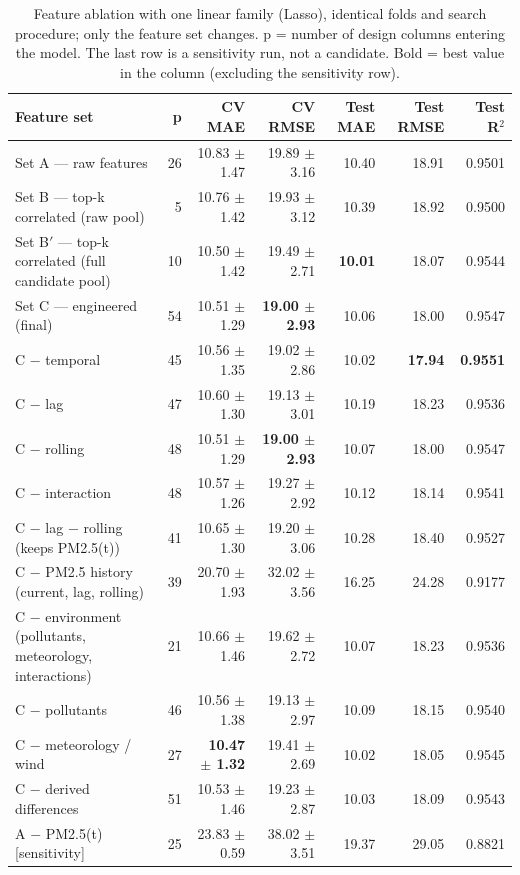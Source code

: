 \begin{table}[t]
\centering
\small
\caption{Feature ablation with one linear family (Lasso), identical folds and search procedure; only the feature set changes. p = number of design columns entering the model. The last row is a sensitivity run, not a candidate. Bold = best value in the column (excluding the sensitivity row).}
\label{tab:table_4_feature_ablation}
\begin{tabular}{p{6.2cm}rrrrrr}
\toprule
Feature set & p & CV MAE & CV RMSE & Test MAE & Test RMSE & Test R$^2$ \\
\midrule
Set A --- raw features & 26 & 10.83 $\pm$ 1.47 & 19.89 $\pm$ 3.16 & 10.40 & 18.91 & 0.9501 \\
Set B --- top-k correlated (raw pool) & 5 & 10.76 $\pm$ 1.42 & 19.93 $\pm$ 3.12 & 10.39 & 18.92 & 0.9500 \\
Set B$'$ --- top-k correlated (full candidate pool) & 10 & 10.50 $\pm$ 1.42 & 19.49 $\pm$ 2.71 & \textbf{10.01} & 18.07 & 0.9544 \\
Set C --- engineered (final) & 54 & 10.51 $\pm$ 1.29 & \textbf{19.00 $\pm$ 2.93} & 10.06 & 18.00 & 0.9547 \\
C $-$ temporal & 45 & 10.56 $\pm$ 1.35 & 19.02 $\pm$ 2.86 & 10.02 & \textbf{17.94} & \textbf{0.9551} \\
C $-$ lag & 47 & 10.60 $\pm$ 1.30 & 19.13 $\pm$ 3.01 & 10.19 & 18.23 & 0.9536 \\
C $-$ rolling & 48 & 10.51 $\pm$ 1.29 & \textbf{19.00 $\pm$ 2.93} & 10.07 & 18.00 & 0.9547 \\
C $-$ interaction & 48 & 10.57 $\pm$ 1.26 & 19.27 $\pm$ 2.92 & 10.12 & 18.14 & 0.9541 \\
C $-$ lag $-$ rolling (keeps PM2.5(t)) & 41 & 10.65 $\pm$ 1.30 & 19.20 $\pm$ 3.06 & 10.28 & 18.40 & 0.9527 \\
C $-$ PM2.5 history (current, lag, rolling) & 39 & 20.70 $\pm$ 1.93 & 32.02 $\pm$ 3.56 & 16.25 & 24.28 & 0.9177 \\
C $-$ environment (pollutants, meteorology, interactions) & 21 & 10.66 $\pm$ 1.46 & 19.62 $\pm$ 2.72 & 10.07 & 18.23 & 0.9536 \\
C $-$ pollutants & 46 & 10.56 $\pm$ 1.38 & 19.13 $\pm$ 2.97 & 10.09 & 18.15 & 0.9540 \\
C $-$ meteorology / wind & 27 & \textbf{10.47 $\pm$ 1.32} & 19.41 $\pm$ 2.69 & 10.02 & 18.05 & 0.9545 \\
C $-$ derived differences & 51 & 10.53 $\pm$ 1.46 & 19.23 $\pm$ 2.87 & 10.03 & 18.09 & 0.9543 \\
A $-$ PM2.5(t)  [sensitivity] & 25 & 23.83 $\pm$ 0.59 & 38.02 $\pm$ 3.51 & 19.37 & 29.05 & 0.8821 \\
\bottomrule
\end{tabular}
\end{table}
